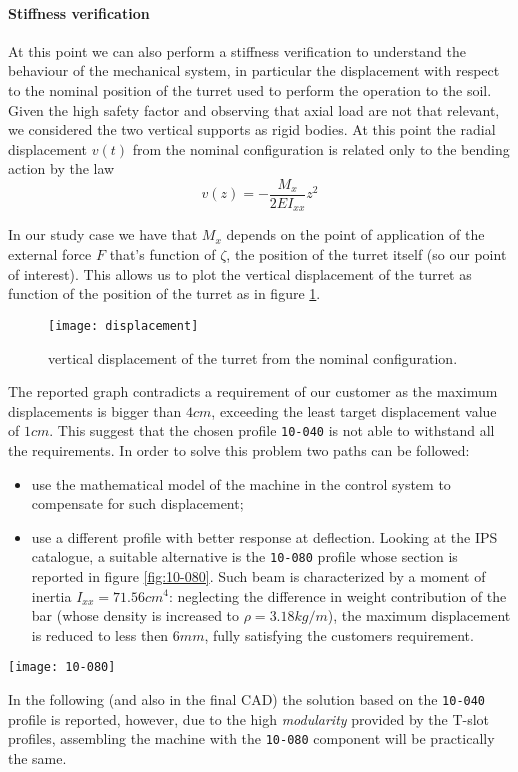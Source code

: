 	\paragraph{Stiffness verification} At this point we can also perform a stiffness verification to understand the behaviour of the mechanical system, in particular the displacement with respect to the nominal position of the turret used to perform the operation to the soil. Given the high safety factor and observing that axial load are not that relevant, we considered the two vertical supports as rigid bodies. At this point the radial displacement $v(t)$ from the nominal configuration is related only to the bending action by the law
	\[ v(z) = - \frac{M_x}{2EI_{xx}}z^2 \]
	
	In our study case we have that $M_x$ depends on the point of application of the external force $F$ that's function of $\zeta$, the position of the turret itself (so our point of interest). This allows us to plot the vertical displacement of the turret as function of the position of the turret as in figure \ref{fig:displacement}. 
	\begin{figure}[tb]
		\centering \texttt{[image: displacement]}
		\caption{vertical displacement of the turret from the nominal configuration.} \label{fig:displacement}
	\end{figure}

	The reported graph contradicts a requirement of our customer as the maximum displacements is bigger than $4cm$, exceeding the least target displacement value of $1cm$. This suggest that the chosen profile \texttt{10-040} is not able to withstand all the requirements. In order to solve this problem two paths can be followed:
	\begin{itemize}
		\item use the mathematical model of the machine in the control system to compensate for such displacement;
		\item use a different profile with better response at deflection. Looking at the IPS catalogue, a suitable alternative is the \texttt{10-080} profile whose section is reported in figure \ref{fig:10-080}. Such beam is characterized by a moment of inertia $I_{xx} = 71.56cm^4$: neglecting the difference in weight contribution of the bar (whose density is increased to $\rho = 3.18kg/m$),  the maximum displacement is reduced to less then $6mm$, fully satisfying the customers requirement.
	\end{itemize}
	\begin{SCfigure}[3][bht]
		\centering
		\texttt{[image: 10-080]}
		\caption{section of the \texttt{10-080} T-slot profile by Parker IPS\cite{parker-ds}.}
		\label{fig:10-080}
	\end{SCfigure}
	
	In the following (and also in the final CAD) the solution based on the \texttt{10-040} profile is reported, however, due to the high \textit{modularity} provided by the T-slot profiles, assembling the machine with the \texttt{10-080} component will be practically the same.
	
	